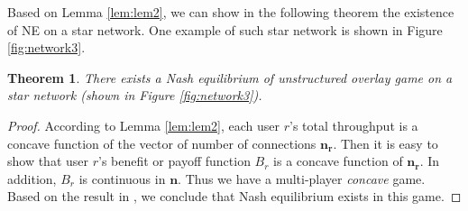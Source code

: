 \documentclass[conference]{IEEEtran}
\newtheorem{theorem}{Theorem}
\begin{document}
\begin{comment}
In the star topology, each user r has multiple paths to transfer
data to itself. Each path has two links. One link is the private
download link of user r, and the other link is the public upload
link of another peer. The private download link is shared by all
paths of user r. For example, in Figure \ref{fig:network2}, user
r's data receiving node is node A, its private link is link $B\to
A$. All paths, e.g., $C\to B\to A$ or $D\to B \to A$, share a
common link $B\to A$. Other than this common link, no any two
paths share any other common link.
\end{comment}

Based on Lemma \ref{lem:lem2}, we can show in the following
theorem the existence of NE on a star network.
One
example of such star network is shown in Figure
\ref{fig:network3}.

\begin{theorem}
There exists a Nash equilibrium of unstructured overlay game on a
star network (shown in Figure \ref{fig:network3}).
\label{them:star}
\end{theorem}


\begin{proof}
According to Lemma \ref{lem:lem2}, each user $r$'s total
throughput is a concave function of the vector of number of
connections $\mathbf{n_r}$. Then it is easy to show that user
$r$'s benefit or payoff function $B_r$ is a concave function of
$\mathbf{n_r}$. In addition, $B_r$ is continuous in $\mathbf{n}$.
Thus we have a multi-player \textit{concave} game. Based on the
result in \cite{rosen65}, we conclude that Nash equilibrium exists
in this game.
\end{proof}

\end{document}
